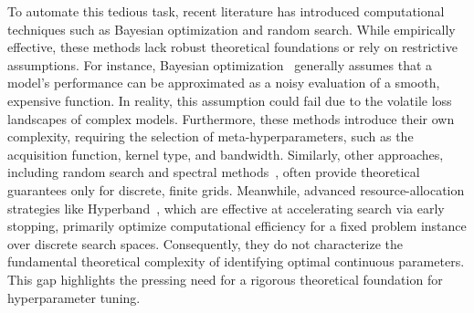 \documentclass{article}
\theoremstyle{plain}
\theoremstyle{definition}
\theoremstyle{remark}
\begin{document}
To automate this tedious task, recent literature has introduced computational techniques such as Bayesian optimization and random search. While empirically effective, these methods lack robust theoretical foundations or rely on restrictive assumptions. For instance, Bayesian optimization~\citep{bergstra2011algorithms, snoek2012practical} generally assumes that a model's performance can be approximated as a noisy evaluation of a smooth, expensive function. In reality, this assumption could fail due to the volatile loss landscapes of complex models. Furthermore, these methods introduce their own complexity, requiring the selection of meta-hyperparameters, such as the acquisition function, kernel type, and bandwidth. Similarly, other approaches, including random search and spectral methods~\citep{bergstra2012random, hazan2018hyperparameter}, often provide theoretical guarantees only for discrete, finite grids. Meanwhile, advanced resource-allocation strategies like Hyperband~\citep{li2018hyperband}, which are effective at accelerating search via early stopping, primarily optimize computational efficiency for a fixed problem instance over discrete search spaces. Consequently, they do not characterize the fundamental theoretical complexity of identifying optimal continuous parameters. This gap highlights the pressing need for a rigorous theoretical foundation for hyperparameter tuning.
\end{document}
